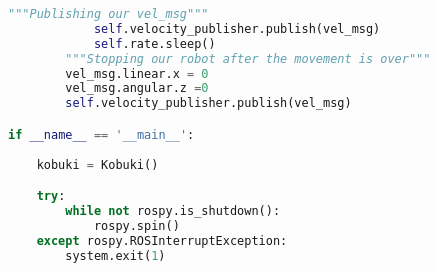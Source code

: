 \begin{lstlisting}[caption={Kobuki Class},label={lst:kobukiclass},language=Python]
            """Publishing our vel_msg"""
            self.velocity_publisher.publish(vel_msg)
            self.rate.sleep()
        """Stopping our robot after the movement is over"""
        vel_msg.linear.x = 0
        vel_msg.angular.z =0
        self.velocity_publisher.publish(vel_msg)

if __name__ == '__main__':
    
    kobuki = Kobuki()

    try:
        while not rospy.is_shutdown():
            rospy.spin()
    except rospy.ROSInterruptException:
        system.exit(1)
\end{lstlisting}
